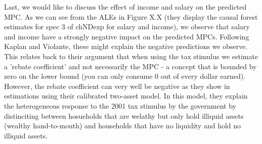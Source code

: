 Last, we would like to discuss the effect of income and salary on the predicted MPC. As we can see from the ALEs in Figure X.X (they display the causal forest estimates for spec 3 of chNDexp for salary and income), we observe that salary and income have a strongly negative impact on the predicted MPCs. Following Kaplan and Violante, these might explain the negative predictions we observe. This relates back to their argument that when using the tax stimulus we estimate a 'rebate coefficient' and not necessarily the MPC - a concept that is bounded by zero on the lower bound (you can only consume 0 out of every dollar earned). However, the rebate coefficient can very well be negative as they show in estimations using their calibrated two-asset model. In this model, they explain the heterogeneous response to the 2001 tax stimulus by the government by distinciting between hosueholds that are welathy but only hold illiquid assets (wealthy hand-to-mouth) and households that have no liquidity and hold no illiquid assets. 